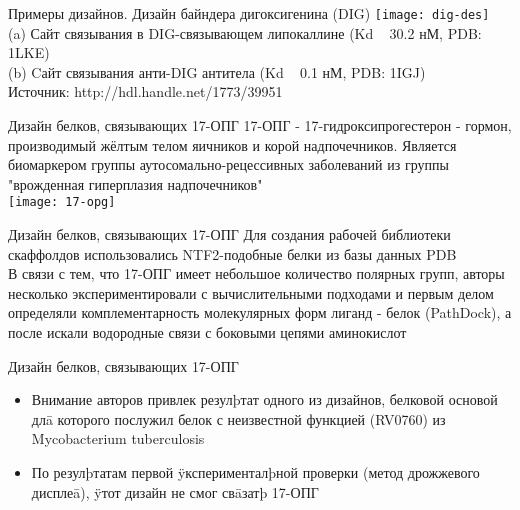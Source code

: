 \begin{frame}{Примеры дизайнов. Дизайн байндера дигоксигенина (DIG)}
       \texttt{[image: dig-des]}\\
       (a) Сайт связывания в DIG-связывающем липокаллине (Kd ~ 30.2 нМ, PDB: 1LKE)\\
(b) Cайт связывания анти-DIG антитела (Kd ~ 0.1 нМ, PDB: 1IGJ)\\
Источник: http://hdl.handle.net/1773/39951
\end{frame}


\begin{frame}{Дизайн белков, связывающих 17-ОПГ}
    17-ОПГ - 17-гидроксипрогестерон - гормон,
    производимый жёлтым телом яичников и корой
    надпочечников. Является биомаркером группы
    аутосомально-рецессивных заболеваний из группы
    "врожденная гиперплазия надпочечников"\\
    \texttt{[image: 17-opg]}
\end{frame}
    
\begin{frame}{Дизайн белков, связывающих 17-ОПГ}
Для создания рабочей библиотеки скаффолдов
использовались NTF2-подобные белки из базы
данных PDB \\

В связи с тем, что 17-ОПГ имеет небольшое
количество полярных групп, авторы несколько
экспериментировали с вычислительными
подходами и первым делом определяли
комплементарность молекулярных форм лиганд -
белок (PathDock), а после искали водородные связи
с боковыми цепями аминокислот
\end{frame}

\begin{frame}{Дизайн белков, связывающих 17-ОПГ}
    \begin{itemize}
        \item Внимание авторов привлек резулþтат одного из дизайнов,
        белковой основой длā которого послужил белок с
        неизвестной функцией (RV0760) из
        Mycobacterium tuberculosis
        \item      По резулþтатам первой ÿксперименталþной проверки
        (метод дрожжевого дисплеā), ÿтот дизайн не смог свāзатþ
        17-ОПГ
    \end{itemize}
\end{frame}

